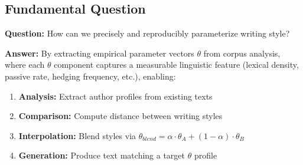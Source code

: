\begin{abstract}
The Scientific Writing Structure Model (SWSM) provides a comprehensive framework for analyzing and generating academic text through precise, measurable parameters. Unlike previous approaches that relied on vague style labels (e.g., ``write like Fehr''), SWSM extracts empirical parameter vectors $\theta$ from corpus analysis, enabling reproducible text generation. The model comprises nine components (E1-E9) spanning cohesion analysis, discourse parsing, move tagging, and text generation. This appendix formally specifies all components, defines 20 axioms (SWSM-1 through SWSM-20), documents the complete $\theta$ parameter schema, and provides worked examples for profile extraction and text generation. SWSM supersedes and deprecates the previous 8D style system, which suffered from definitional ambiguity between audience profiles and writing style parameters.
\end{abstract}


\subsection{Fundamental Question}
\label{sec:sw-fundamental}

\begin{tcolorbox}[colback=yellow!10!white, colframe=orange!75!black, title=Core Contribution]
\textbf{Question:} How can we precisely and reproducibly parameterize writing style?

\textbf{Answer:} By extracting empirical parameter vectors $\theta$ from corpus analysis, where each $\theta$ component captures a measurable linguistic feature (lexical density, passive rate, hedging frequency, etc.), enabling:
\begin{enumerate}
    \item \textbf{Analysis:} Extract author profiles from existing texts
    \item \textbf{Comparison:} Compute distance between writing styles
    \item \textbf{Interpolation:} Blend styles via $\theta_{blend} = \alpha \cdot \theta_A + (1-\alpha) \cdot \theta_B$
    \item \textbf{Generation:} Produce text matching a target $\theta$ profile
\end{enumerate}
\end{tcolorbox}

